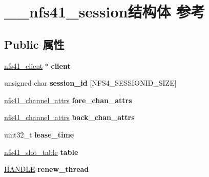 \hypertarget{struct____nfs41__session}{}\section{\+\_\+\+\_\+nfs41\+\_\+session结构体 参考}
\label{struct____nfs41__session}
\subsection*{Public 属性}
\begin{DoxyCompactItemize}
\item 
\mbox{\label{struct____nfs41__session_aadc765cf7ca2b51e9c071599ee41d26c}} 
\hyperlink{struct____nfs41__client}{nfs41\+\_\+client} $\ast$ {\bfseries client}
\item 
\mbox{\label{struct____nfs41__session_a1e073083d0752b319ddec2bf2a49a317}} 
unsigned char {\bfseries session\+\_\+id} \mbox{[}N\+F\+S4\+\_\+\+S\+E\+S\+S\+I\+O\+N\+I\+D\+\_\+\+S\+I\+ZE\mbox{]}
\item 
\mbox{\label{struct____nfs41__session_a6b88f8929c0d2c08fdecb21bec819b69}} 
\hyperlink{struct____nfs41__channel__attrs}{nfs41\+\_\+channel\+\_\+attrs} {\bfseries fore\+\_\+chan\+\_\+attrs}
\item 
\mbox{\label{struct____nfs41__session_ab6e3ddfe9a392cd25ed5e7c543660680}} 
\hyperlink{struct____nfs41__channel__attrs}{nfs41\+\_\+channel\+\_\+attrs} {\bfseries back\+\_\+chan\+\_\+attrs}
\item 
\mbox{\label{struct____nfs41__session_ac5978cfc5ca91f8891cd4c5edfbdcb51}} 
uint32\+\_\+t {\bfseries lease\+\_\+time}
\item 
\mbox{\label{struct____nfs41__session_a29133a85de7a8d3a671e4da708f55743}} 
\hyperlink{struct____nfs41__slot__table}{nfs41\+\_\+slot\+\_\+table} {\bfseries table}
\item 
\mbox{\label{struct____nfs41__session_acebe838afb62926608223fbf1fe6b532}} 
\hyperlink{interfacevoid}{H\+A\+N\+D\+LE} {\bfseries renew\+\_\+thread}
\item 

\end{DoxyCompactItemize}
